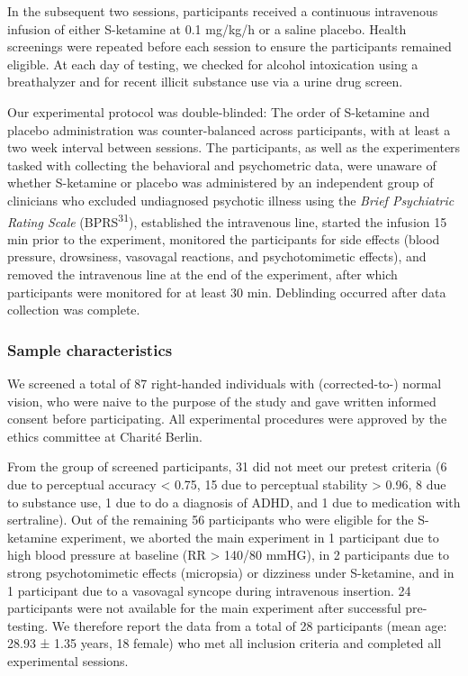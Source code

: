 \documentclass[
]{article}
\begin{document}
In the subsequent two sessions, participants received a continuous
intravenous infusion of either S-ketamine at 0.1 mg/kg/h or a saline
placebo. Health screenings were repeated before each session to ensure
the participants remained eligible. At each day of testing, we checked
for alcohol intoxication using a breathalyzer and for recent illicit
substance use via a urine drug screen.

Our experimental protocol was double-blinded: The order of S-ketamine
and placebo administration was counter-balanced across participants,
with at least a two week interval between sessions. The participants, as
well as the experimenters tasked with collecting the behavioral and
psychometric data, were unaware of whether S-ketamine or placebo was
administered by an independent group of clinicians who excluded
undiagnosed psychotic illness using the \emph{Brief Psychiatric Rating
Scale} (BPRS\textsuperscript{31}), established the intravenous line,
started the infusion 15 min prior to the experiment, monitored the
participants for side effects (blood pressure, drowsiness, vasovagal
reactions, and psychotomimetic effects), and removed the intravenous
line at the end of the experiment, after which participants were
monitored for at least 30 min. Deblinding occurred after data collection
was complete.

\subsubsection{Sample characteristics}\label{sample-characteristics}

We screened a total of 87 right-handed individuals with (corrected-to-)
normal vision, who were naive to the purpose of the study and gave
written informed consent before participating. All experimental
procedures were approved by the ethics committee at Charité Berlin.

From the group of screened participants, 31 did not meet our pretest
criteria (6 due to perceptual accuracy \textless{} 0.75, 15 due to
perceptual stability \textgreater{} 0.96, 8 due to substance use, 1 due
to do a diagnosis of ADHD, and 1 due to medication with sertraline). Out
of the remaining 56 participants who were eligible for the S-ketamine
experiment, we aborted the main experiment in 1 participant due to high
blood pressure at baseline (RR \textgreater{} 140/80 mmHG), in 2
participants due to strong psychotomimetic effects (micropsia) or
dizziness under S-ketamine, and in 1 participant due to a vasovagal
syncope during intravenous insertion. 24 participants were not available
for the main experiment after successful pre-testing. We therefore
report the data from a total of 28 participants (mean age: 28.93 ± 1.35
years, 18 female) who met all inclusion criteria and completed all
experimental sessions.
\end{document}
